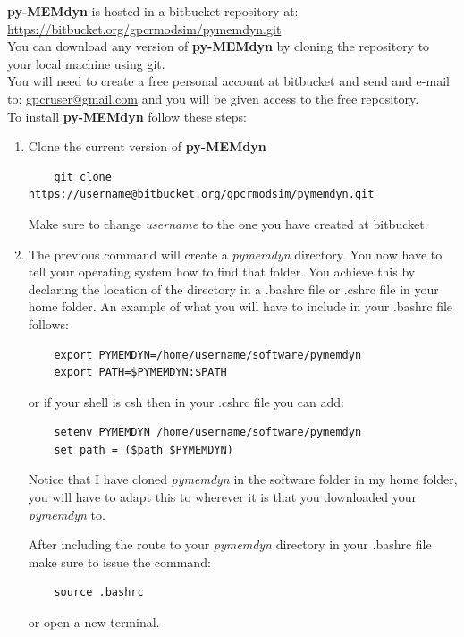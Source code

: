 \documentclass[10pt, oneside, pdftex]{article}
\begin{document}
\noindent \textbf{py-MEMdyn} is hosted in a bitbucket repository at:\\

\noindent \url{https://bitbucket.org/gpcrmodsim/pymemdyn.git}\\

\noindent  You  can  download  any version  of  \textbf{py-MEMdyn}  by
cloning the repository to your local machine using git.\\

\noindent You will need to create a free personal account at bitbucket
and send and e-mail to: \url{gpcruser@gmail.com} and you will be given
access to the free repository.\\

\noindent To install \textbf{py-MEMdyn} follow these steps:
\begin{enumerate}
\item{Clone the current version of \textbf{py-MEMdyn}
\begin{Verbatim}
    git clone https://username@bitbucket.org/gpcrmodsim/pymemdyn.git
\end{Verbatim}
Make sure to change \textit{username} to the one you have created 
at bitbucket.}

\item{The previous command will  create a \textit{pymemdyn} directory.
  You  now  have to  tell  your  operating  system  how to  find  that
  folder. You achieve this by  declaring the location of the directory
  in a .bashrc file or .cshrc file in your home folder.  An example of
  what you will have to include in your .bashrc file follows:
\begin{Verbatim}
    export PYMEMDYN=/home/username/software/pymemdyn
    export PATH=$PYMEMDYN:$PATH
\end{Verbatim}
or if your shell is csh then in your .cshrc file you can add:
\begin{Verbatim}
    setenv PYMEMDYN /home/username/software/pymemdyn
    set path = ($path $PYMEMDYN)
\end{Verbatim}

Notice that I have cloned  \textit{pymemdyn} in the software folder in
my home folder, you will have to adapt this to wherever it is that you
downloaded your \textit{pymemdyn} to.

After including the route to your \textit{pymemdyn} directory in your
.bashrc file make sure to issue the command:
\begin{Verbatim}
    source .bashrc
\end{Verbatim}
or open a new terminal.\\

}
\end{enumerate}
\end{document}
